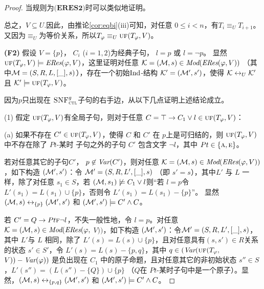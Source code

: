 \begin{proof}
	当规则为$\textbf{(ERES2)}$时可以类似地证明。
	
	总之，$V\subseteq U$.因此，由推论\ref{cor:eqbi}(iii)可知，对任意 $0 \leq i < n$，有$T_i \equiv_U T_{i+1}$。
	又因为$\equiv_U$为等价关系，所以$T_{\varphi} \equiv_U \textsc{uf}(T_\varphi,V)$。
	
	
	
	\textbf{(F2)} 假设 $V=\{p\}$， $C_i$ ($i=1,2$)为经典子句，  $l = p$ 或 $l = \neg p$。
	显然 $\textsc{uf}(T_\varphi,V) \models \emph{ERes}(\varphi,V)$，这里证明对任意 ${\cal K}=({\cal M}, s)\in \textit{Mod}(\emph{ERes}(\varphi,V))$ （其中${\cal M}=(S, R, L, [\_], s)$），存在一个初始$\textrm{Ind}$-结构 ${\cal K}'=({\cal M}', s')$，使得 ${\cal K} \leftrightarrow_{U} {\cal K}'$ 且 ${\cal K}' \models \textsc{uf}(T_\varphi,V)$。
	
	
	因为$p$只出现在 ${\textsc{SNF}_{\textsc{ctl}}^g}$子句的右手边，从以下几点证明上述结论成立。
	
	(1) 假定 $\textsc{uf}(T_\varphi,V)$有全局子句，则对于任意 $C=\top\rightarrow C_1 \vee l \in \textsc{uf}(T_\varphi,V)$：
	
	(a) 如果不存在 $C'\in \textsc{uf}(T_\varphi,V)$，使得 $C$ 和 $C'$ 在 $p$上是可归结的，则 $\textsc{uf}(T_\varphi,V)$中不存在除了 $Pt$-某时 子句之外的子句 $C'$ 包含文字 $\neg l$，其中 $Pt\in \{\textsc{a}, \textsc{e}\}$。
	
	若对任意其它的子句$C'$， $p\not \in \textit{Var}(C')$，则对任意 ${\cal K}=({\cal M}, s)\in \textit{Mod}(\emph{ERes}(\varphi,V))$，如下构造 $({\cal M}',s')$：令 ${\cal M}'= (S, R, L',[\_], s)$ （即 $s'=s$），其中$L'$ 与 $L$ 一样，除了对任意 $s_1\in S$，若 $({\cal M}, s_1) \not \models C_1 \vee l$则“若 $l=p$令 $L'(s_1) = L(s_1) \cup \{p\}$，否则令 $L'(s_1) = L(s_1) - \{p\}$”。
	显然 $({\cal M}, s) \leftrightarrow_{\{p\}} ({\cal M}', s')$ 和 $({\cal M}', s') \models C' \wedge C$。
	
	若 $C'= Q\rightarrow Pt \textsc{f} \neg l$，不失一般性地，令 $l=p$。对任意 ${\cal K}=({\cal M}, s)\in \textit{Mod}(\emph{ERes}(\varphi,$ $V))$，如下构造 $({\cal M}',s')$：令${\cal M}'=(S, R, L',[\_], s)$，其中 $L'$与 $L$ 相同，除了
	$L'(s) = L(s) \cup \{p\}$，且对任意具有$(s, s')\in R$关系的状态 $s'\in S'$，令 $L'(s) = L(s) - \{p, q\}$，其中 $q \in (\textit{Var}(\textsc{uf}(T_\varphi,$ $V))-\textit{Var}(\varphi))$ 是负出现在 $C_1$ 中的原子命题，且对任意其它的非初始状态 $s'' \in S$，$L'(s'') = (L(s'') - \{Q\}) \cup \{p\}$ （$Q$在 $Pt$-某时子句中是一个原子）。显然，$({\cal M}, s) \leftrightarrow_{\{p,q\}} ({\cal M}', s')$ 和 $({\cal M}', s') \models C' \wedge C$。
	

\end{proof}
